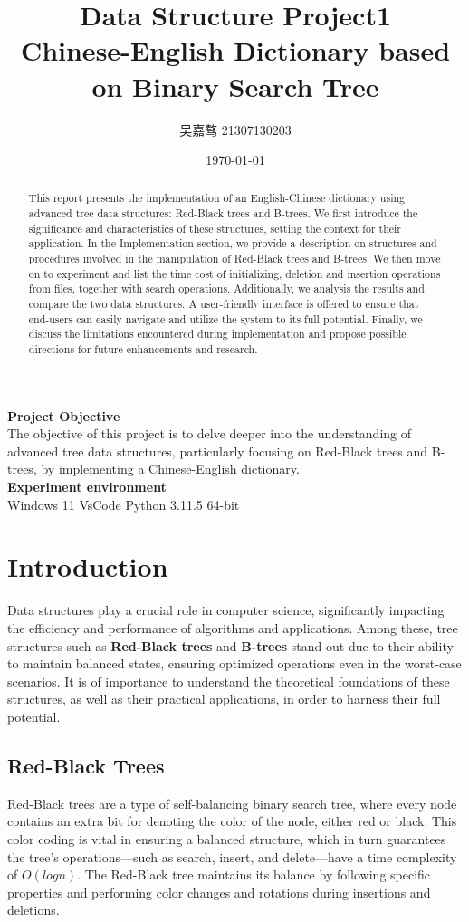 \documentclass[UTF8]{ctexart}
\title{\textbf{Data Structure Project1}\\{\Large Chinese-English Dictionary based on Binary
Search Tree}}
\author{吴嘉骜 21307130203}
\date{\today}
\begin{document}
\maketitle
\begin{abstract}
    \normalsize
    \noindent
    This report presents the implementation of an English-Chinese dictionary using advanced tree data structures: Red-Black trees and B-trees. 
    We first introduce the significance and characteristics of these structures, setting the context for their application. 
    In the Implementation section, we provide a description on structures and procedures involved in the manipulation of Red-Black trees and B-trees. 
    We then move on to experiment and list the time cost of initializing, deletion and insertion operations from files, together with search operations.
    Additionally, we analysis the results and compare the two data structures. 
    A user-friendly interface is offered to ensure that end-users can easily navigate and utilize the system to its full potential. 
    Finally, we discuss the limitations encountered during implementation and propose possible directions for future enhancements and research.
\end{abstract}

\noindent
\textbf {Project Objective}\\  The objective of this project is to delve deeper 
into the understanding of advanced tree data structures, particularly focusing on Red-Black trees and B-trees,
by implementing a Chinese-English dictionary.\\
\noindent
\textbf {Experiment environment} \\
    Windows 11 VsCode Python 3.11.5 64-bit

\section{Introduction}
\setlength{\parindent}{0pt}
Data structures play a crucial role in computer science, significantly impacting the 
efficiency and performance of algorithms and applications. 
Among these, tree structures such as \textbf{Red-Black trees} and \textbf{B-trees} stand out due to their 
ability to maintain balanced states, ensuring optimized operations even in the worst-case scenarios. It 
is of importance to understand the theoretical foundations of these structures, as well as their
practical applications, in order to harness their full potential.

\subsection{Red-Black Trees}
Red-Black trees are a type of self-balancing binary search tree, where every node 
contains an extra bit for denoting the color of the node, either red or black. 
This color coding is vital in ensuring a balanced structure, which in turn guarantees 
the tree's operations—such as search, insert, and delete—have a time complexity of $O(log n)$. 
The Red-Black tree maintains its balance by following specific properties and performing 
color changes and rotations during insertions and deletions.
\end{document}
